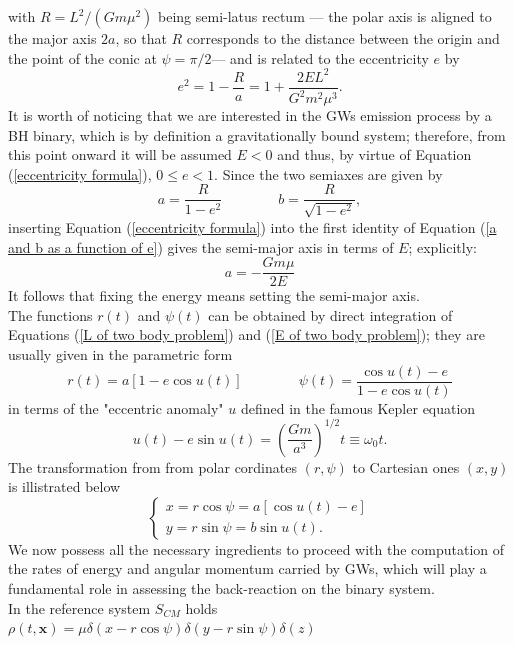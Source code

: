 with $R=L^2/(Gm\mu^2)$ being semi-latus rectum --- the polar axis is aligned to the major axis $2a$, so that 
$R$ corresponds to the distance between the origin and the point of the conic at $\psi=\pi/2$--- and is related to the eccentricity $e$ by 
\begin{equation}\label{eccentricity formula}
    e^2=1-\frac{R}{a}=1+\frac{2EL^2}{G^2m^2\mu^3}.
\end{equation}
It is worth of noticing that we are interested in the GWs emission process by a BH binary, which is by definition a gravitationally bound system; therefore, from this point onward it will be assumed $E<0$ and thus, by virtue of Equation (\ref{eccentricity formula}), $0\le e<1$.
Since the two semiaxes are given by
\begin{equation}\label{a and b as a function of e}
    a=\frac{R}{1-e^2} \qquad \qquad b=\frac{R}{\sqrt{1-e^2}},
\end{equation}
inserting Equation (\ref{eccentricity formula}) into the first identity of Equation (\ref{a and b as a function of e}) gives the semi-major axis in terms of $E$; explicitly:
\begin{equation}\label{a as a function of E}
    a=-\frac{Gm\mu}{2E}
\end{equation}
It follows that fixing the energy means setting the semi-major axis.\\The functions $r(t)$ and $\psi(t)$ can be obtained by direct integration of Equations (\ref{L of two body problem}) and (\ref{E of two body problem}); they are usually given in the parametric form
\begin{equation}
    r(t)=a[1-e\cos{u(t)}] \qquad \qquad\psi(t)=\frac{\cos{u(t)}-e}{1-e\cos{u(t)}}
\end{equation}
in terms of the "eccentric anomaly" $u$ defined in the famous Kepler equation
\begin{equation}
    u(t)-e\sin{u(t)}=\left(\frac{Gm}{a^3}\right)^{1/2}t\equiv \omega_0 t.
\end{equation}
The transformation from from polar cordinates $(r,\psi)$ to Cartesian ones $(x,y)$ is illistrated below
\begin{equation}
\begin{cases}
x = r \cos\psi = a\left[\cos u(t) - e\right] \\
y = r \sin\psi = b \sin u(t) .
\end{cases}
\end{equation}
We now possess all the necessary ingredients to proceed with the computation of the rates of energy and angular momentum carried by GWs, which will play a fundamental role in assessing the back-reaction on the binary system.\\In the reference system $S_{CM}$ holds $\rho(t,\mathbf{x})=\mu\delta(x-r\cos{\psi})\delta(y-r\sin{\psi})\delta(z)$
